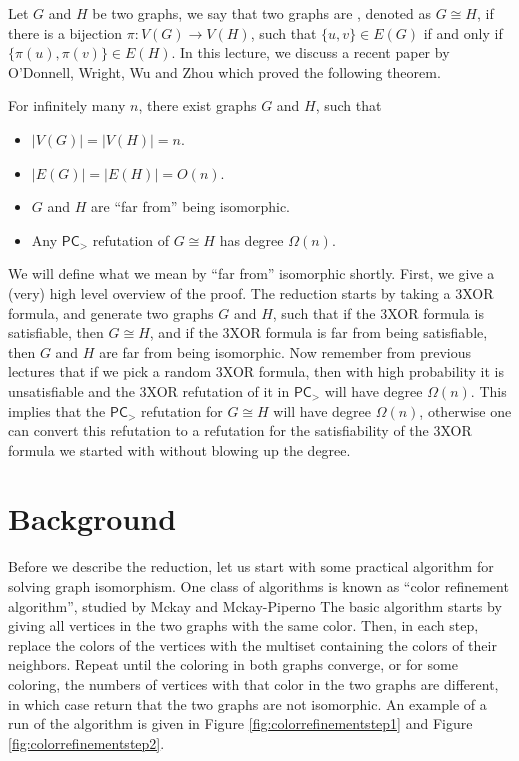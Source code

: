 \documentclass[a4paper,twoside,justified]{tufte-handout}
\begin{document}
 

Let $G$ and $H$ be two graphs, we say that two graphs are ,
denoted as $G \cong H$,
if there is a bijection $\pi: V(G) \to V(H)$, such that $\{u,v\} \in E(G)$
if and only if $\{\pi(u),\pi(v)\} \in E(H)$. In this lecture, we discuss
a recent paper by O'Donnell, Wright, Wu and Zhou \cite{robustgraphiso}
which proved the following theorem.

\begin{theorem}\label{thm:main}
  For infinitely many $n$, there exist graphs $G$ and $H$, such that
  \begin{itemize}
    \item $|V(G)|=|V(H)|=n$.
    \item $|E(G)|=|E(H)|=O(n)$.
    \item $G$ and $H$ are ``far from'' being isomorphic.
    \item Any $\mathsf{PC}_{>}$ refutation of $G \cong H$ has degree $\Omega(n)$.
  \end{itemize}
\end{theorem}

We will define what we mean by ``far from'' isomorphic shortly. First, we give a (very) high level
overview of the proof. The reduction starts by taking a 3XOR formula, and generate two graphs $G$ and $H$, such
that if the 3XOR formula is satisfiable, then $G \cong H$, and if the 3XOR formula is far from being satisfiable,
then $G$ and $H$ are far from being isomorphic. Now remember from previous lectures that if we pick a random 3XOR formula,
then with high probability it is unsatisfiable and the 3XOR refutation of it in $\mathsf{PC}_{>}$ will have degree $\Omega(n)$.
This implies that the $\mathsf{PC}_{>}$ refutation for $G \cong H$ will have degree $\Omega(n)$, otherwise one
can convert this refutation to a refutation for the satisfiability of the 3XOR formula we started with without blowing up the degree.

\section{Background}
Before we describe the reduction, let us start with some practical algorithm for solving graph isomorphism. 
One class of algorithms is known as ``color refinement algorithm'', studied by Mckay \cite{mckay} and Mckay-Piperno \cite{mckay14}
The basic algorithm starts by giving all vertices in the two graphs with the same color. 
Then, in each step, replace the colors of the vertices with the multiset containing the colors of their neighbors.
Repeat until the coloring in both graphs converge, or for some coloring, the numbers of vertices with that color
in the two graphs are different, in which case return that the two graphs are not isomorphic.
An example of a run of the algorithm is given in Figure \ref{fig:colorrefinementstep1} and Figure
\ref{fig:colorrefinementstep2}.
\end{document}

